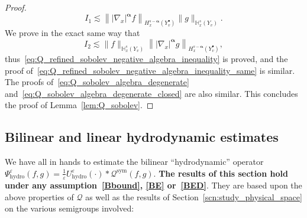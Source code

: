 \documentclass[10pt]{amsart}
\theoremstyle{definition}\newtheorem{defi}[theo]{Definition}\newtheorem{rema}[theo]{Remark}\newtheorem{exam}[theo]{Example}\newtheorem{exem}[theo]{Example}\newtheorem{nota}[theo]{Notation}
\newcommand{\hyd}{\mathrm{hydro}}
\newcommand{\sym}{\mathrm{sym}}
\newcommand{\bbH}{\mathbb{H}}
\newcommand{\QQ}{\mathcal{Q}}
\newcommand{\Sg}{Y}
\newcommand{\Sgp}{Y^{\bullet}}
\newcommand*\eps{{\varepsilon}}
\begin{document}
\begin{proof}
\[
I_1 \lesssim \left\| | \nabla_x |^{\boldsymbol{\alpha}} f \right\|_{ H^{ s-\boldsymbol{\alpha} }_x \left(\Sgp_v \right) } \| g \|_{ \bbH^s_x \left(\Sg_v \right) }.
\]
We prove in the exact same way that
\[
I_2 \lesssim \| f \|_{ \bbH^s_x \left(\Sg_v \right) } \left\| | \nabla_x |^{\boldsymbol{\alpha}} g \right\|_{ H^{ s-\boldsymbol{\alpha} }_x \left(\Sgp_v \right) },
\]
thus~\eqref{eq:Q_refined_sobolev_negative_algebra_inequality} is proved, and the proof of~\eqref{eq:Q_refined_sobolev_negative_algebra_inequality_same} is similar. The proofs of~\eqref{eq:Q_sobolev_algebra_degenerate} and~\eqref{eq:Q_sobolev_algebra_degenerate_closed} are also similar. This concludes the proof of Lemma~\ref{lem:Q_sobolev}.
\end{proof}

\subsection{Bilinear and linear hydrodynamic estimates}

We have all in hands to estimate the bilinear ``hydrodynamic'' operator $\Psi^\eps_\hyd(f,g)=\frac{1}{\eps}U_\hyd^\eps(\cdot) \ast \QQ^\sym(f,g)$. \textbf{The results of this section hold under any assumption~\eqref{Bbound}, \eqref{BE} or~\eqref{BED}}. They are based upon the above properties of $\QQ$ as well as the results of Section~\ref{scn:study_physical_space} on the various semigroups involved:
\end{document}
